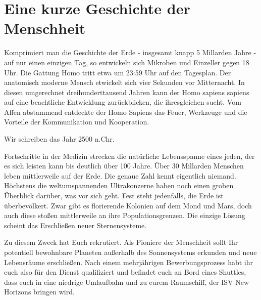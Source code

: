 \chapter[Prolog]{Eine kurze Geschichte der Menschheit}

\begin{say}
Komprimiert man die Geschichte der Erde - insgesamt knapp 5 Millarden Jahre - auf nur einen einzigen Tag, so entwickeln sich Mikroben und Einzeller gegen
18 Uhr. Die Gattung Homo tritt etwa um 23:59 Uhr auf den Tagesplan. Der anatomisch moderne Mensch etwickelt sich vier Sekunden vor Mitternacht. In diesen
umgerechnet dreihunderttausend Jahren kann der Homo sapiens sapiens auf eine beachtliche Entwicklung zurückblicken, die ihresgleichen sucht. Vom Affen
abstammend entdeckte der Homo Sapiens das Feuer, Werkzeuge und die Vorteile der Kommunikation und Kooperation. 

Wir schreiben das Jahr 2500 n.Chr.

Fortschritte in der Medizin strecken die natürliche Lebensspanne eines jeden, der es sich leisten kann bis deutlich über 100 Jahre. Über 30 Millarden
Menschen leben mittlerweile auf der Erde. Die genaue Zahl kennt eigentlich niemand. Höchstens die weltumspannenden Ultrakonzerne haben noch einen groben
Überblick darüber, was vor sich geht. Fest steht jedenfalls, die Erde ist überbevölkert. Zwar gibt es florierende Kolonien auf dem Mond und Mars, doch auch
diese stoßen mittlerweile an ihre Populationsgrenzen. Die einzige Lösung scheint das Erschließen neuer Sternensysteme.

Zu diesem Zweck hat  Euch rekrutiert. Als Pioniere der Menschheit sollt Ihr potentiell bewohnbare Planeten außerhalb des Sonnensystems
erkunden und neue Lebensräume erschließen. Nach einem mehrjährigen Bewerbungsprozess habt ihr euch also für den Dienst qualifiziert und befindet euch an
Bord eines Shuttles, dass euch in eine niedrige Umlaufbahn und zu eurem Raumschiff, der ISV New Horizons bringen wird.
\end{say}
